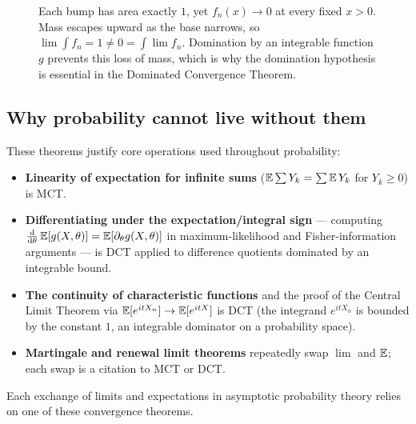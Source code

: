 \begin{figure}[H]
\centering
{}
\caption{Each bump has area exactly $1$, yet $f_n(x)\to 0$ at every fixed
$x>0$. Mass escapes upward as the base narrows, so $\lim\int f_n = 1 \ne 0 =
\int\lim f_n$. Domination by an integrable function $g$ prevents this loss of
mass, which is why the domination hypothesis is essential in the Dominated
Convergence Theorem.}
\label{ch37:fig-bump}
\end{figure}

\subsection{Why probability cannot live without them}

\begin{aestheticbox}
These theorems justify core operations used throughout probability:
\begin{itemize}
\item \textbf{Linearity of expectation for infinite sums}
  ($\operatorname{\mathbb{E}}\sum Y_k = \sum \operatorname{\mathbb{E}} Y_k$ for $Y_k\ge0$) is MCT.
\item \textbf{Differentiating under the expectation/integral sign}
  --- computing $\frac{\mathrm{d}}{\mathrm{d}\theta}\operatorname{\mathbb{E}}[g(X,\theta)] = \operatorname{\mathbb{E}}[\partial_\theta
  g(X,\theta)]$ in maximum-likelihood and Fisher-information arguments --- is
  DCT applied to difference quotients dominated by an integrable bound.
\item \textbf{The continuity of characteristic functions} and the proof of the
  Central Limit Theorem via $\operatorname{\mathbb{E}}[e^{itX_n}]\to\operatorname{\mathbb{E}}[e^{itX}]$ is DCT (the
  integrand $e^{itX_n}$ is bounded by the constant $1$, an integrable dominator
  on a probability space).
\item \textbf{Martingale and renewal limit theorems} repeatedly swap $\lim$ and
  $\operatorname{\mathbb{E}}$; each swap is a citation to MCT or DCT.
\end{itemize}
Each exchange of limits and expectations in asymptotic probability theory
relies on one of these convergence theorems.
\end{aestheticbox}

